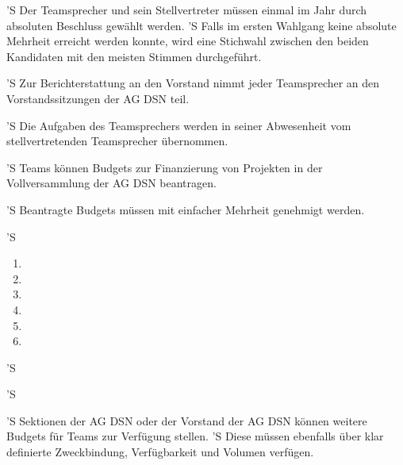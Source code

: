 \documentclass[draft,parskip=half-,DIV=12,mpinclude]{scrartcl}
\begin{document}
\begin{contract}
'S Der Teamsprecher und sein Stellvertreter müssen einmal im Jahr durch absoluten Beschluss gewählt werden.
'S Falls im ersten Wahlgang keine absolute Mehrheit erreicht werden konnte, wird eine Stichwahl zwischen den beiden Kandidaten mit den meisten Stimmen durchgeführt.

'S Zur Berichterstattung an den Vorstand nimmt jeder Teamsprecher an den Vorstandssitzungen der AG DSN teil.

'S Die Aufgaben des Teamsprechers werden in seiner Abwesenheit vom stellvertretenden Teamsprecher übernommen.


'S Teams können Budgets zur Finanzierung von Projekten in der Vollversammlung der AG DSN beantragen.

'S Beantragte Budgets müssen mit einfacher Mehrheit genehmigt werden.

'S 
\begin{enumerate}
  \item {}
  \item {}
  \item {}
  \item {}
  \item {}
  \item {}
\end{enumerate}


'S 

'S 

'S Sektionen der AG DSN oder der Vorstand der AG DSN können weitere Budgets für Teams zur Verfügung stellen.
'S Diese müssen ebenfalls über klar definierte Zweckbindung, Verfügbarkeit und Volumen verfügen.


\end{contract}
\end{document}
